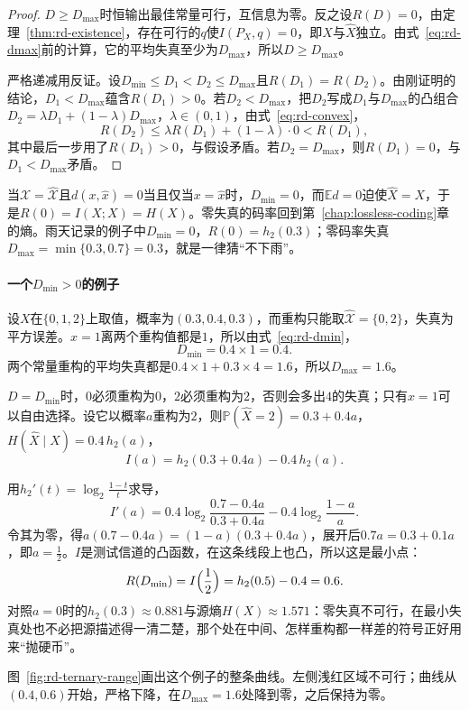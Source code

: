 \begin{proof}
$D\geq D_{\max}$时恒输出最佳常量可行，互信息为零。反之设$R(D)=0$，由定理~\ref{thm:rd-existence}，存在可行的$q$使$I(P_X,q)=0$，即$X$与$\hat{X}$独立。由式~\eqref{eq:rd-dmax}前的计算，它的平均失真至少为$D_{\max}$，所以$D\geq D_{\max}$。

严格递减用反证。设$D_{\min}\leq D_1<D_2\leq D_{\max}$且$R(D_1)=R(D_2)$。由刚证明的结论，$D_1<D_{\max}$蕴含$R(D_1)>0$。若$D_2<D_{\max}$，把$D_2$写成$D_1$与$D_{\max}$的凸组合$D_2=\lambda D_1+(1-\lambda)D_{\max}$，$\lambda\in(0,1)$，由式~\eqref{eq:rd-convex}，
\[
  R(D_2)\leq\lambda R(D_1)+(1-\lambda)\cdot0<R(D_1),
\]
其中最后一步用了$R(D_1)>0$，与假设矛盾。若$D_2=D_{\max}$，则$R(D_1)=0$，与$D_1<D_{\max}$矛盾。
\end{proof}

当$\mathcal{X}=\hat{\mathcal{X}}$且$d(x,\hat{x})=0$当且仅当$x=\hat{x}$时，$D_{\min}=0$，而$\mathbb{E}d=0$迫使$\hat{X}=X$，于是$R(0)=I(X;X)=H(X)$。零失真的码率回到第~\ref{chap:lossless-coding}章的熵。雨天记录的例子中$D_{\min}=0$，$R(0)=h_2(0.3)$；零码率失真$D_{\max}=\min\{0.3,0.7\}=0.3$，就是一律猜“不下雨”。

\paragraph{一个$D_{\min}>0$的例子}
设$X$在$\{0,1,2\}$上取值，概率为$(0.3,0.4,0.3)$，而重构只能取$\hat{\mathcal{X}}=\{0,2\}$，失真为平方误差。$x=1$离两个重构值都是$1$，所以由式~\eqref{eq:rd-dmin}，
\[
  D_{\min}=0.4\times1=0.4 .
\]
两个常量重构的平均失真都是$0.4\times1+0.3\times4=1.6$，所以$D_{\max}=1.6$。

$D=D_{\min}$时，$0$必须重构为$0$，$2$必须重构为$2$，否则会多出$4$的失真；只有$x=1$可以自由选择。设它以概率$a$重构为$2$，则$\mathbb{P}(\hat{X}=2)=0.3+0.4a$，$H(\hat{X}\mid X)=0.4\,h_2(a)$，
\[
  I(a)=h_2(0.3+0.4a)-0.4\,h_2(a).
\]

用$h_2'(t)=\log_2\frac{1-t}{t}$求导，
\[
  I'(a)=0.4\log_2\frac{0.7-0.4a}{0.3+0.4a}-0.4\log_2\frac{1-a}{a}.
\]
令其为零，得$a(0.7-0.4a)=(1-a)(0.3+0.4a)$，展开后$0.7a=0.3+0.1a$，即$a=\tfrac12$。$I$是测试信道的凸函数，在这条线段上也凸，所以这是最小点：
\[
  R(D_{\min})=I\Bigl(\frac12\Bigr)=h_2(0.5)-0.4=0.6 .
\]
对照$a=0$时的$h_2(0.3)\approx0.881$与源熵$H(X)\approx1.571$：零失真不可行，在最小失真处也不必把源描述得一清二楚，那个处在中间、怎样重构都一样差的符号正好用来“抛硬币”。

图~\ref{fig:rd-ternary-range}画出这个例子的整条曲线。左侧浅红区域不可行；曲线从$(0.4,0.6)$开始，严格下降，在$D_{\max}=1.6$处降到零，之后保持为零。

